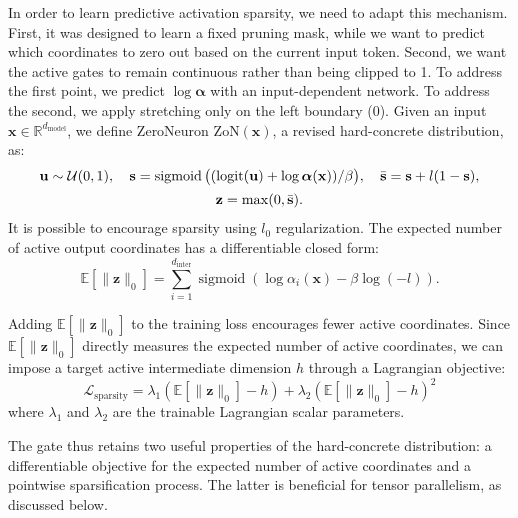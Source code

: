 In order to learn predictive activation sparsity, we need to adapt this mechanism.
First, it was designed to learn a fixed pruning mask, while we want to predict which
coordinates to zero out based on the current input token.
Second, we want the active gates to remain continuous rather than being clipped to 1.
To address the first point, we predict $\log\boldsymbol{\alpha}$ with an input-dependent network.
To address the second, we apply stretching only on the left boundary ($0$).
Given an input $\textbf{x} \in \mathbb{R}^{d_{\text{model}}}$,
we define ZeroNeuron ${\mathrm{ZoN}}(\mathbf{x})$, a revised hard-concrete distribution, as:
\begin{equation}
    \resizebox{\dimexpr\linewidth-3em\relax}{!}{$\displaystyle
    \begin{gathered}
    \mathbf{u}\sim\mathcal{U}(0,1),\quad
    \mathbf{s}=\operatorname{sigmoid}\big((\operatorname{logit}(\mathbf{u})+\log\boldsymbol{\alpha}(\mathbf{x}))/\beta\big),\quad
    \bar{\mathbf{s}}=\mathbf{s}+l(1-\mathbf{s}),\\[2pt]
    \mathbf{z}=\max(0,\bar{\mathbf{s}}).
    \end{gathered}
    $}
\end{equation}
It is possible to encourage sparsity using $l_0$ regularization.
The expected number of active output coordinates has a differentiable closed form:
\begin{equation}
    \mathbb{E}\!\left[\|\mathbf{z}\|_0\right] = \sum_{i=1}^{d_{\text{inter}}}
    \operatorname{sigmoid}\!\left(\log\alpha_i(\mathbf{x})-\beta\log(-l)\right).
\end{equation}

Adding $\mathbb{E}[\|\mathbf{z}\|_0]$ to the training loss encourages fewer active coordinates.
Since $\mathbb{E}\!\left[\|\mathbf{z}\|_0\right]$ directly measures the expected number of active
coordinates, we can impose a target active intermediate dimension $h$ through a Lagrangian objective:
\begin{equation}
    \label{eq:zon-lg}
    \mathcal{L}_{\text{sparsity}} = \lambda_1 (\mathbb{E}\!\left[\|\mathbf{z}\|_0\right] - h) + \lambda_2 {(\mathbb{E}\!\left[\|\mathbf{z}\|_0\right] - h)}^2
\end{equation}
where $\lambda_1$ and $\lambda_2$ are the trainable Lagrangian scalar parameters.

The gate thus retains two useful properties of the hard-concrete distribution:
a differentiable objective for the expected number of active coordinates and a
pointwise sparsification process. The latter is beneficial for tensor parallelism,
as discussed below.

